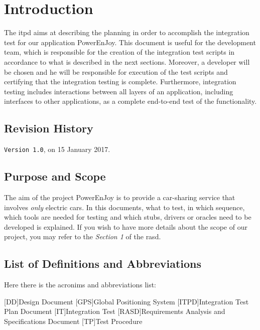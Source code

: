 \section{Introduction} \label{sec:intro}

The \acl{itpd} aims at describing the planning in order to accomplish the integration test for our application PowerEnJoy. 
This document is useful for the development team, which is responsible for the creation of the integration test scripts in accordance to what is described in the next sections. Moreover, a developer will be chosen and he will be responsible for execution of the test scripts and certifying that the integration testing is complete. Furthermore, integration testing includes interactions between all layers of an application, including interfaces to other applications, as a complete end-to-end test of the functionality. 

\subsection{Revision History}
\texttt{Version 1.0}, on 15 January 2017.

\subsection{Purpose and Scope}
The aim of the project PowerEnJoy is to provide a car-sharing service that involves \textit{only} electric cars. In this documents, what to test, in which sequence, which tools are needed for testing and which stubs, drivers or oracles need to be developed is explained. If you wish to have more details about the scope of our project, you may refer to the \textit{Section 1} of the \acl{rasd}.

\subsection{List of Definitions and Abbreviations}
Here there is the acronims and abbreviations list:

\begin{acronym}[DD] %

[DD]{Design Document}
[GPS]{Global Positioning System}
[ITPD]{Integration Test Plan Document}
[IT]{Integration Test}
[RASD]{Requirements Analysis and Specifications Document}
[TP]{Test Procedure}

\end{acronym}

